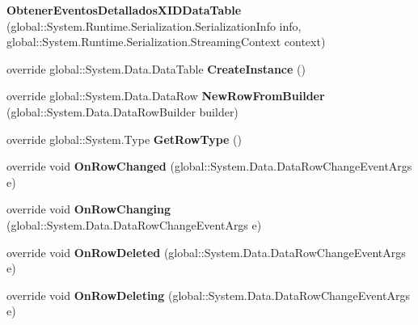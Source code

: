 \begin{DoxyCompactItemize}
\item 
{\bfseries Obtener\+Eventos\+Detallados\+X\+I\+D\+Data\+Table} (global\+::\+System.\+Runtime.\+Serialization.\+Serialization\+Info info, global\+::\+System.\+Runtime.\+Serialization.\+Streaming\+Context context)\label{class_resa___pro_1_1_resa_d_b_data_set_1_1_obtener_eventos_detallados_x_i_d_data_table_a0df56553d5fd00f16a981c4eaa9b4ba7}

\item 
override global\+::\+System.\+Data.\+Data\+Table {\bfseries Create\+Instance} ()\label{class_resa___pro_1_1_resa_d_b_data_set_1_1_obtener_eventos_detallados_x_i_d_data_table_a26fe1bb2fd27ea73e053955f42de6632}

\item 
override global\+::\+System.\+Data.\+Data\+Row {\bfseries New\+Row\+From\+Builder} (global\+::\+System.\+Data.\+Data\+Row\+Builder builder)\label{class_resa___pro_1_1_resa_d_b_data_set_1_1_obtener_eventos_detallados_x_i_d_data_table_aad6ea1ec7b4484f87d1c926125b4b524}

\item 
override global\+::\+System.\+Type {\bfseries Get\+Row\+Type} ()\label{class_resa___pro_1_1_resa_d_b_data_set_1_1_obtener_eventos_detallados_x_i_d_data_table_a4da8a0f9bd6990749cbcb5c41ab2ce70}

\item 
override void {\bfseries On\+Row\+Changed} (global\+::\+System.\+Data.\+Data\+Row\+Change\+Event\+Args e)\label{class_resa___pro_1_1_resa_d_b_data_set_1_1_obtener_eventos_detallados_x_i_d_data_table_a5b34db41b3ca48748cb44b2f905071fc}

\item 
override void {\bfseries On\+Row\+Changing} (global\+::\+System.\+Data.\+Data\+Row\+Change\+Event\+Args e)\label{class_resa___pro_1_1_resa_d_b_data_set_1_1_obtener_eventos_detallados_x_i_d_data_table_a06ee03b8f53504ded671aa0d63ded939}

\item 
override void {\bfseries On\+Row\+Deleted} (global\+::\+System.\+Data.\+Data\+Row\+Change\+Event\+Args e)\label{class_resa___pro_1_1_resa_d_b_data_set_1_1_obtener_eventos_detallados_x_i_d_data_table_ae34f8ac0cfc3376985072e52a9e36331}

\item 
override void {\bfseries On\+Row\+Deleting} (global\+::\+System.\+Data.\+Data\+Row\+Change\+Event\+Args e)\label{class_resa___pro_1_1_resa_d_b_data_set_1_1_obtener_eventos_detallados_x_i_d_data_table_a8f20201833cb776cc83c44fdf81673f0}

\end{DoxyCompactItemize}
